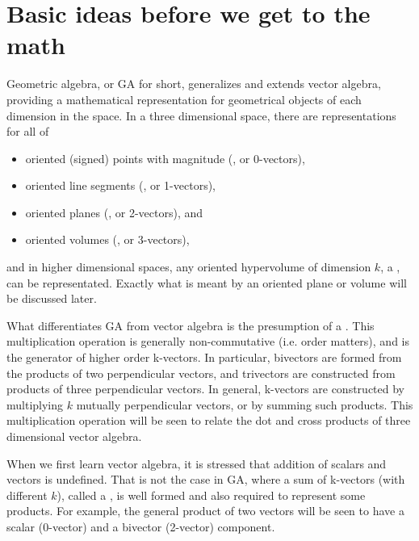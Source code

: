 \section{Basic ideas before we get to the math}
Geometric algebra, or GA for short, generalizes and extends vector algebra, providing a mathematical representation for geometrical objects of each dimension in the space.
In a three dimensional space, there are representations for all of

\begin{itemize}
\item
oriented (signed) points with magnitude (, or 0-vectors),
\item
oriented line segments (, or 1-vectors),
\item
oriented planes (, or 2-vectors), and
\item
oriented volumes (, or 3-vectors),
\end{itemize}

and in higher dimensional spaces, any oriented hypervolume of dimension \( k \), a , can be representated.
Exactly what is meant by an oriented plane or volume will be discussed later.

What
differentiates GA from vector algebra is the presumption of a .
This
multiplication operation is generally non-commutative (i.e. order matters), and is the generator of higher order k-vectors.
In particular,
bivectors are formed from the products of two perpendicular vectors,
and trivectors are constructed from products of three perpendicular vectors.
In general, k-vectors are constructed by multiplying \( k \) mutually perpendicular vectors, or by summing such products.
This multiplication operation will be seen to relate the dot and cross products of three dimensional vector algebra.

When we first learn vector algebra, it is stressed that addition of scalars and vectors is undefined.
That is not the case in GA, where a sum of k-vectors (with different \(k\)), called a ,
is well formed and also required to represent some products.
For example, the general product of two vectors will be seen to have a scalar (0-vector) and a bivector (2-vector) component.


